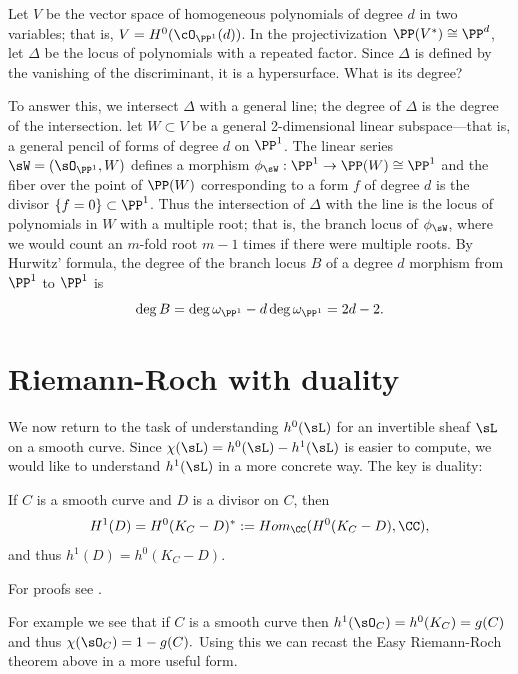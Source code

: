 \begin{example}
 Let $V$ be the vector space of homogeneous polynomials of degree $d$ in two variables; that is, $V = H^0(\cO_{\PP^1}(d))$. In the projectivization $\PP(V^{*}) \cong \PP^d$, let $\Delta$ be the locus of polynomials with a repeated factor. Since $\Delta$ is defined by the vanishing of the discriminant, it is a hypersurface. What is its degree?
 
 To answer this, we intersect $\Delta$ with a general line; the degree of $\Delta$ is the degree of the intersection.  let $W\subset V$ be a general 2-dimensional linear subspace---that is, a general pencil of forms of degree $d$ on $\PP^1$. The linear series $\sW = (\sO_{\PP^{1}}, W)$ defines a morphism $\phi_{\sW} : \PP^{1} \to \PP(W) \cong \PP^{1}$ and the fiber over the point of $\PP(W)$ corresponding to a form $f$ of degree $d$ is the divisor $\{f = 0\}\subset \PP^{1}$. Thus the intersection of $\Delta$ with the line is the locus of polynomials in $W$ with a multiple root; that is, the branch locus of $\phi_{\sW}$, where we would count an $m$-fold root $m-1$ times if there were multiple roots.
 By Hurwitz' formula, the degree of the branch locus $B$ of a degree $d$ morphism from $\PP^{1}$ to $\PP^{1}$ is
 $$
 \deg B = \deg \omega_{\PP^{1}} - d\deg \omega_{\PP^{1}} = 2d-2.
 $$
 \end{example}
  

\section{Riemann-Roch with duality}

We now return to the task of understanding $h^0(\sL)$ for an invertible sheaf $\sL$ on a smooth curve. Since $\chi(\sL) = h^0(\sL)-h^1(\sL)$ is easier to compute, we would like to understand $h^1(\sL)$ in a more concrete way. The key is duality:
 
\begin{theorem}\label{sd}
If $C$ is a smooth curve and $D$ is a divisor on $C$, then
$$
H^1(D) =H^0(K_C-D)^* := Hom_\CC(H^0(K_C-D), \CC),
$$
and thus $h^1(D) = h^0(K_C-D)$.
\end{theorem}

For proofs see \cite[Theorem III.5.2 and III.7.6]{H}. 

For example we see that if $C$ is a smooth curve then $h^1 (\sO_C) = h^0(K_C) = g(C)$ and thus $\chi(\sO_C) = 1-g(C).$   
Using this we can recast the Easy Riemann-Roch theorem above in a more useful form. 

